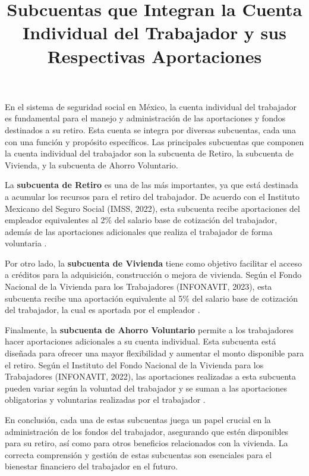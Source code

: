 \documentclass[a4paper,12pt]{article}
\title{Subcuentas que Integran la Cuenta Individual del Trabajador y sus Respectivas Aportaciones}
\author{}
\date{}
\begin{document}
\maketitle



En el sistema de seguridad social en México, la cuenta individual del trabajador es fundamental para el manejo y administración de las aportaciones y fondos destinados a su retiro. Esta cuenta se integra por diversas subcuentas, cada una con una función y propósito específicos. Las principales subcuentas que componen la cuenta individual del trabajador son la subcuenta de Retiro, la subcuenta de Vivienda, y la subcuenta de Ahorro Voluntario.



La \textbf{subcuenta de Retiro} es una de las más importantes, ya que está destinada a acumular los recursos para el retiro del trabajador. De acuerdo con el Instituto Mexicano del Seguro Social (IMSS, 2022), esta subcuenta recibe aportaciones del empleador equivalentes al 2\% del salario base de cotización del trabajador, además de las aportaciones adicionales que realiza el trabajador de forma voluntaria \parencite{IMSS2022}.



Por otro lado, la \textbf{subcuenta de Vivienda} tiene como objetivo facilitar el acceso a créditos para la adquisición, construcción o mejora de vivienda. Según el Fondo Nacional de la Vivienda para los Trabajadores (INFONAVIT, 2023), esta subcuenta recibe una aportación equivalente al 5\% del salario base de cotización del trabajador, la cual es aportada por el empleador \parencite{INFONAVIT2023}.



Finalmente, la \textbf{subcuenta de Ahorro Voluntario} permite a los trabajadores hacer aportaciones adicionales a su cuenta individual. Esta subcuenta está diseñada para ofrecer una mayor flexibilidad y aumentar el monto disponible para el retiro. Según el Instituto del Fondo Nacional de la Vivienda para los Trabajadores (INFONAVIT, 2022), las aportaciones realizadas a esta subcuenta pueden variar según la voluntad del trabajador y se suman a las aportaciones obligatorias y voluntarias realizadas por el trabajador \parencite{INFONAVIT2022}.



En conclusión, cada una de estas subcuentas juega un papel crucial en la administración de los fondos del trabajador, asegurando que estén disponibles para su retiro, así como para otros beneficios relacionados con la vivienda. La correcta comprensión y gestión de estas subcuentas son esenciales para el bienestar financiero del trabajador en el futuro.


\newpage
\printbibliography
\end{document}
